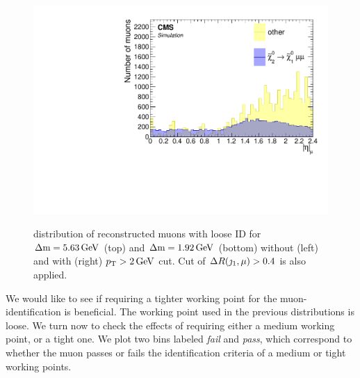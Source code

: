 \begin{figure}[!htb]
\includegraphics[width=0.48\linewidth]{plots/lepton_selection/lepton_selection_dm1p92/none_Muons_Eta_after_pt.pdf} \\
\caption[\abs{\eta} distribution of reconstructed muons with loose ID before and after $\pt>2\GeV$ cut]{ \abs{\eta} distribution of reconstructed muons with loose ID for $\Delta\mathrm{m}=5.63\,\text{Ge\hspace{-.08em}V}$ (top) and $\Delta\mathrm{m}=1.92\,\text{Ge\hspace{-.08em}V}$ (bottom) without (left) and with (right) $\pt>2\GeV$ cut. Cut of $\Delta R(\jmath_1,\mu)>0.4$ is also applied.}
\label{fig:muons-selection-eta}
\end{figure}

We would like to see if requiring a tighter working point for the muon-identification is beneficial. The working point used in the previous distributions is loose. We turn now to check the effects of requiring either a medium working point, or a tight one. We plot two bins labeled \emph{fail} and \emph{pass}, which correspond to whether the muon passes or fails the identification criteria of a medium or tight working points.

